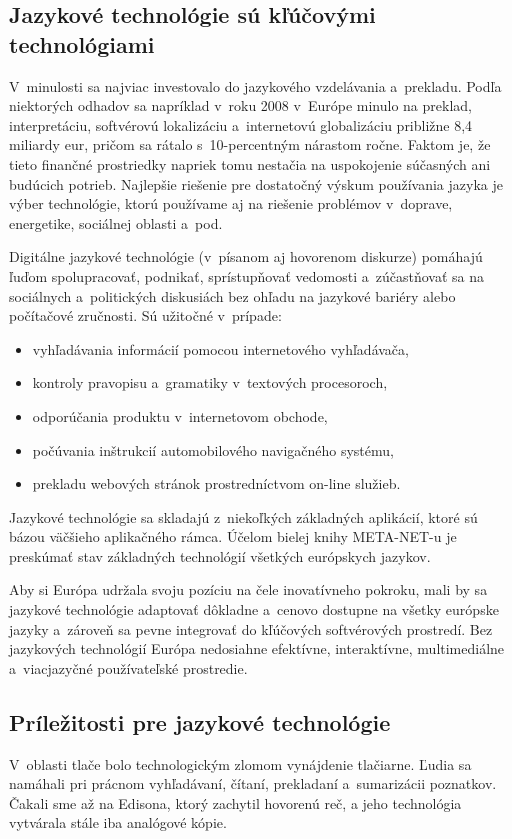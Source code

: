 \begin{multicols}{2}
\subsection{Jazykové technológie sú kľúčovými technológiami}
V~minulosti sa najviac investovalo do jazykového vzdelávania a~prekladu. Podľa
niektorých odhadov sa napríklad v~roku 2008 v~Európe minulo na preklad,
interpretáciu, softvérovú lokalizáciu a~internetovú globalizáciu približne 8,4
miliardy eur, pričom sa rátalo s~10-percentným nárastom ročne\cite{EC3}. Faktom je,
že tieto finančné prostriedky napriek tomu nestačia na uspokojenie súčasných
ani budúcich potrieb. Najlepšie riešenie pre dostatočný výskum používania
jazyka je výber technológie, ktorú používame aj na riešenie problémov
v~doprave, energetike, sociálnej oblasti a~pod.

Digitálne jazykové technológie (v~písanom aj hovorenom diskurze) pomáhajú ľuďom spolupracovať, podnikať, sprístupňovať vedomosti a~zúčastňovať sa na sociálnych a~politických diskusiách bez ohľadu na jazykové bariéry alebo počítačové zručnosti. Sú užitočné v~prípade:

\begin{itemize}
\item vyhľadávania informácií pomocou internetového vyhľadávača,
\item kontroly pravopisu a~gramatiky v~textových procesoroch,
\item odporúčania produktu v~internetovom obchode,
\item počúvania inštrukcií automobilového navigačného systému,
\item prekladu webových stránok prostredníctvom on-line služieb.
\end{itemize}

Jazykové technológie sa skladajú z~niekoľkých základných
aplikácií, ktoré sú bázou väčšieho aplikačného rámca.
Účelom bielej knihy META-NET-u je preskúmať stav základných
technológií všetkých európskych jazykov.

Aby si Európa udržala svoju pozíciu na čele inovatívneho pokroku,
mali by sa jazykové technológie adaptovať dôkladne a~cenovo dostupne
na všetky európske jazyky a~zároveň sa pevne integrovať do
kľúčových softvérových prostredí. Bez jazykových technológií
Európa nedosiahne efektívne, interaktívne, multimediálne
a~viacjazyčné používateľské prostredie.


\subsection{Príležitosti pre jazykové technológie}
V~oblasti tlače bolo technologickým zlomom vynájdenie
tlačiarne. Ľudia sa namáhali pri prácnom vyhľadávaní, čítaní,
prekladaní a~sumarizácii poznatkov. Čakali sme až na Edisona, ktorý
zachytil hovorenú reč, a jeho technológia vytvárala stále iba analógové
kópie.


\end{multicols}
